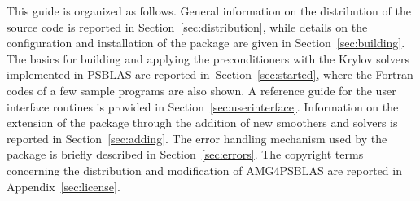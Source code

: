 This guide is organized as follows. General information on the distribution of the source
code is reported in Section~\ref{sec:distribution}, while details on the configuration
and installation of the package are given in Section~\ref{sec:building}. The basics for building and applying the
preconditioners with the Krylov solvers implemented in PSBLAS are reported
in~Section~\ref{sec:started}, where the Fortran codes of a few sample programs
are also shown. A reference guide for the user interface routines is provided
in Section~\ref{sec:userinterface}. Information on the extension of the package
through the addition of new smoothers and solvers is reported in Section~\ref{sec:adding}.
The error handling mechanism used by the package
is briefly described in Section~\ref{sec:errors}. The copyright terms concerning the
distribution and modification of AMG4PSBLAS are reported in Appendix~\ref{sec:license}.

